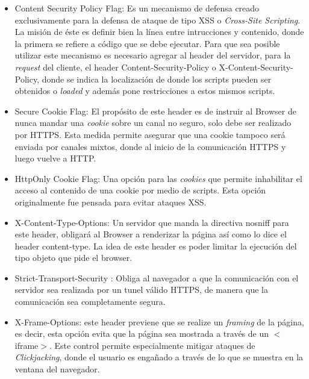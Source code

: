         \begin{itemize}
            \item Content Security Policy Flag: Es un mecanismo de defensa creado exclusivamente para la defensa de ataque de tipo XSS o \textit{Cross-Site Scripting}. La misión de éste es definir bien la línea entre intrucciones y contenido, donde la primera se refiere a código que se debe ejecutar. Para que sea posible utilizar este mecanismo es necesario agregar al header del servidor, para la \textit{request} del cliente, el header Content-Security-Policy o X-Content-Security-Policy, donde se indica la localización de donde los scripts pueden ser obtenidos o \textit{loaded} y además pone restricciones a estos mismos scripts.

            \item Secure Cookie Flag: El propósito de este header es de instruir al Browser de nunca mandar una \textit{cookie} sobre un canal no seguro, solo debe ser realizado por HTTPS. Esta medida permite asegurar que una cookie tampoco será enviada por canales mixtos, donde al inicio de la comunicación HTTPS y luego vuelve a HTTP.

            \item HttpOnly Cookie Flag: Una opción para las \textit{cookies} que permite inhabilitar el acceso al contenido de una cookie por medio de scripts. Esta opción originalmente fue pensada para evitar ataques XSS.

            \item X-Content-Type-Options: Un servidor que manda la directiva nosniff para este header, obligará al Browser a renderizar la página así como lo dice el header content-type. La idea de este header es poder limitar la ejecución del tipo objeto que pide el browser.

            \item Strict-Transport-Security \cite{RFC-6797}: Obliga al navegador a que la comunicación con el servidor sea realizada por un tunel válido HTTPS, de manera que la comunicación sea completamente segura.

            \item X-Frame-Options: este header previene que se realize un \textit{framing} de la página, es decir, esta opción evita que la página sea mostrada a través de un \(<\)iframe\(>\). Este control permite especialmente mitigar ataques de \textit{Clickjacking}, donde el usuario es engañado a través de lo que se muestra en la ventana del navegador.
        \end{itemize}

